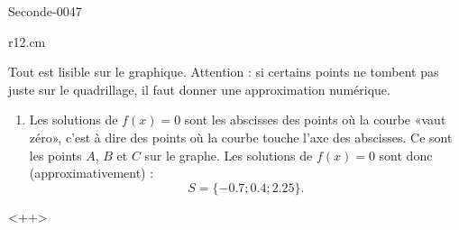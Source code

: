 
\begin{corrige}{Seconde-0047}


\begin{wrapfigure}{r}{12.cm}
   \vspace{-1cm}        %
   \centering
   
\end{wrapfigure}

    Tout est lisible sur le graphique. Attention : si certains points ne tombent pas juste sur le quadrillage, il faut donner une approximation numérique.
    \begin{enumerate}
        \item
            Les solutions de \( f(x)=0\) sont les abscisses des points où la courbe «vaut zéro», c'est à dire des points où la courbe touche l'axe des abscisses. Ce sont les points \( A\), \( B\) et \( C\) sur le graphe. Les solutions de \( f(x)=0\) sont donc (approximativement) :
            \begin{equation}
                S=\{ -0.7;0.4;2.25 \}.
            \end{equation}
    \end{enumerate}
    <++>

\end{corrige}
